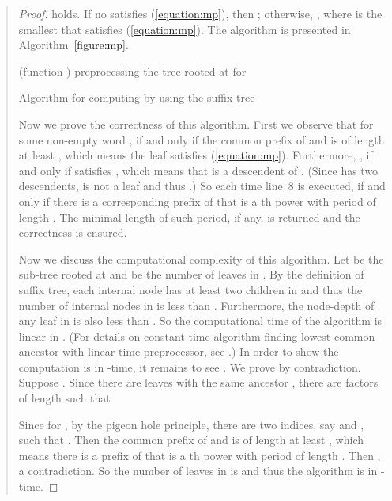 \documentclass{article}
\begin{document}
\begin{quote}
\begin{enumerate}
{{{{\begin{proof}
holds. If no  satisfies (\ref{equation:mp}), then
; otherwise, , where  is the
smallest  that satisfies (\ref{equation:mp}). The algorithm is
presented in Algorithm~\ref{figure:mp}.

\begin{algorithm}
  \SetLine
  \linesnumbered
  \Begin(function \KwComputeMP{, , }){
    \lIf{}{\Return{}} \lElse{} \;
    \lWhile{}{ \;}
     \;
    preprocessing the tree rooted at  for  \;
    \Return{} \;
  }
  \caption{Algorithm for computing  by using the suffix tree }
  \label{figure:mp}
\end{algorithm}

Now we prove the correctness of this algorithm. First we observe
that  for some non-empty word , if and only if the common
prefix of  and  is of length
at least , which means the leaf 
satisfies (\ref{equation:mp}). Furthermore, , if and only
if  satisfies
, which means
that  is a descendent of . (Since  has two
descendents,  is not a leaf and thus .)
So each time line~8 is executed, if and only if there is a
corresponding prefix of  that is a th power with period of
length . The minimal length of such period, if any, is
returned and the correctness is ensured.

Now we discuss the computational complexity of this algorithm. Let
 be the sub-tree rooted at  and  be the number of leaves
in . By the definition of suffix tree, each internal node has
at least two children in  and thus the number of internal nodes
in  is less than . Furthermore, the node-depth of any leaf
in  is also less than . So the computational time of the
algorithm is linear in . (For details on constant-time algorithm
finding lowest common ancestor with linear-time preprocessor, see
\cite{Harel&Tarjan1984,Schieber&Vishkin1988}.) In order to show the
computation is in -time, it
remains to see . We prove
 by contradiction. Suppose
. Since there are  leaves
 with the same ancestor , there are 
factors of length  such that
  
Since  for , by the pigeon hole
principle, there are two indices, say  and , such that
. Then the common
prefix of  and  is of length at
least , which means there is a prefix
of 
that is a th power with period of length . Then
, a contradiction. So the number of
leaves in  is  and thus the
algorithm is in -time.
\end{proof}


}}}}
\end{enumerate}
\end{quote}
\end{document}
